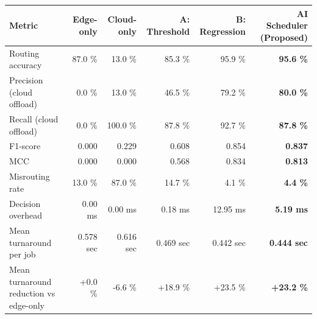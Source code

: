 \begin{tabular}{lrrrrr}
\toprule
Metric & Edge-only & Cloud-only & A: Threshold & B: Regression & \textbf{AI Scheduler (Proposed)} \\
\midrule
Routing accuracy & 87.0 \% & 13.0 \% & 85.3 \% & 95.9 \% & \textbf{95.6 \%} \\
Precision (cloud offload) & 0.0 \% & 13.0 \% & 46.5 \% & 79.2 \% & \textbf{80.0 \%} \\
Recall (cloud offload) & 0.0 \% & 100.0 \% & 87.8 \% & 92.7 \% & \textbf{87.8 \%} \\
F1-score & 0.000 & 0.229 & 0.608 & 0.854 & \textbf{0.837} \\
MCC & 0.000 & 0.000 & 0.568 & 0.834 & \textbf{0.813} \\
Misrouting rate & 13.0 \% & 87.0 \% & 14.7 \% & 4.1 \% & \textbf{4.4 \%} \\
Decision overhead & 0.00 ms & 0.00 ms & 0.18 ms & 12.95 ms & \textbf{5.19 ms} \\
Mean turnaround per job & 0.578 sec & 0.616 sec & 0.469 sec & 0.442 sec & \textbf{0.444 sec} \\
Mean turnaround reduction vs edge-only & +0.0 \% & -6.6 \% & +18.9 \% & +23.5 \% & \textbf{+23.2 \%} \\
\bottomrule
\end{tabular}
